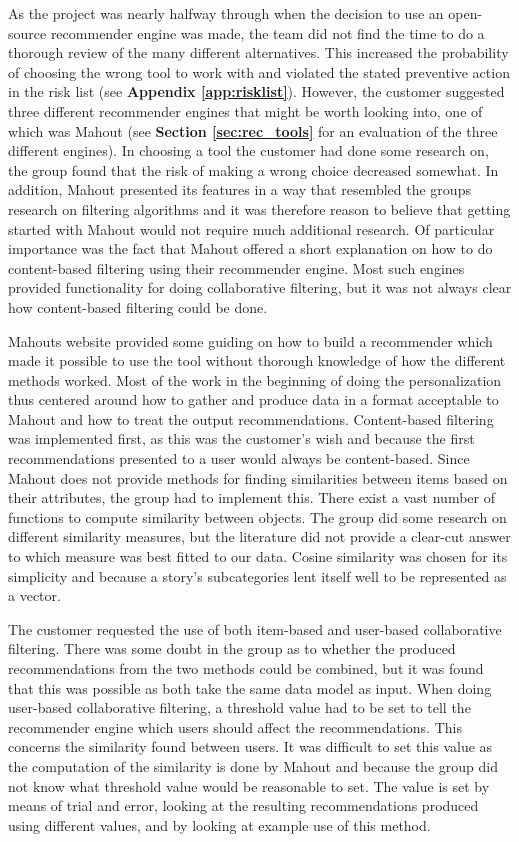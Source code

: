 As the project was nearly halfway through when the decision to use an open-source recommender engine was made, the team did not find the time to do a thorough review of the many different alternatives. This increased the probability of choosing the wrong tool to work with and violated the stated preventive action in the risk list (see \textbf{Appendix \ref{app:risklist}}). However, the customer suggested three different recommender engines that might be worth looking into, one of which was Mahout (see \textbf{Section \ref{sec:rec_tools}} for an evaluation of the three different engines). In choosing a tool the customer had done some research on, the group found that the risk of making a wrong choice decreased somewhat. In addition, Mahout presented its features in a way that resembled the groups research on filtering algorithms and it was therefore reason to believe that getting started with Mahout would not require much additional research. Of particular importance was the fact that Mahout offered a short explanation on how to do content-based filtering using their recommender engine. Most such engines provided functionality for doing collaborative filtering, but it was not always clear how content-based filtering could be done.\newline

Mahouts website provided some guiding on how to build a recommender which made it possible to use the tool without thorough knowledge of how the different methods worked. Most of the work in the beginning of doing the personalization thus centered around how to gather and produce data in a format acceptable to Mahout and how to treat the output recommendations. Content-based filtering was implemented first, as this was the customer's wish and because the first recommendations presented to a user would always be content-based. Since Mahout does not provide methods for finding similarities between items based on their attributes, the group had to implement this. There exist a vast number of functions to compute similarity between objects. The group did some research on different similarity measures, but the literature did not provide a clear-cut answer to which measure was best fitted to our data. Cosine similarity was chosen for its simplicity and because a story's subcategories lent itself well to be represented as a vector.\newline

The customer requested the use of both item-based and user-based collaborative filtering. There was some doubt in the group as to whether the produced recommendations from the two methods could be combined, but it was found that this was possible as both take the same data model as input. When doing user-based collaborative filtering, a threshold value had to be set to tell the recommender engine which users should affect the recommendations. This concerns the similarity found between users. It was difficult to set this value as the computation of the similarity is done by Mahout and because the group did not know what threshold value would be reasonable to set. The value is set by means of trial and error, looking at the resulting recommendations produced using different values, and by looking at example use of this method. \newline

